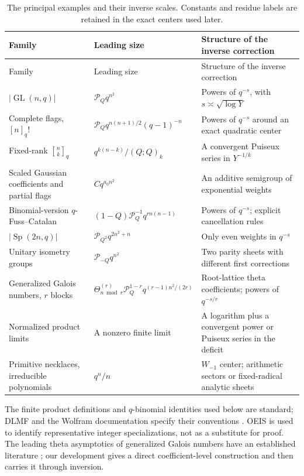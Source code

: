 \documentclass[11pt]{article}
\numberwithin{equation}{section}
\theoremstyle{definition}
\newcommand{\GL}{\operatorname{GL}}
\newcommand{\Sp}{\operatorname{Sp}}
\newcommand{\qbin}[2]{\genfrac{[}{]}{0pt}{}{#1}{#2}_{q}}
\newcommand{\pp}[1]{(Q;Q)_{#1}}
\newcommand{\Pinf}{\mathcal P_Q}
\newcommand{\T}{\Theta}
\begin{document}
\begin{longtable}{@{}>{\raggedright\arraybackslash}p{}>{\raggedright\arraybackslash}p{}>{\raggedright\arraybackslash}p{}@{}}
\caption{The principal examples and their inverse scales. Constants and residue labels are retained in the exact centers used later.}\label{tab:map}\\
\toprule
Family & Leading size & Structure of the inverse correction\\
\midrule\endfirsthead
\toprule Family & Leading size & Structure of the inverse correction\\\midrule\endhead
$\lvert\GL(n,q)\rvert$ & $\Pinf q^{n^2}$ & Powers of $q^{-s}$, with $s\asymp\sqrt{\log Y}$\\
Complete flags, $[n]_q!$ & $\Pinf q^{n(n+1)/2}(q-1)^{-n}$ & Powers of $q^{-s}$ around an exact quadratic center\\
Fixed-rank $\qbin{n}{k}$ & $q^{k(n-k)}/\pp{k}$ & A convergent Puiseux series in $Y^{-1/k}$\\
Scaled Gaussian coefficients and partial flags & $Cq^{a_0n^2}$ & An additive semigroup of exponential weights\\
Binomial-version $q$-Fuss--Catalan & $(1-Q)\Pinf^{-1}q^{r n(n-1)}$ & Powers of $q^{-s}$; explicit cancellation rules\\
$\lvert\Sp(2n,q)\rvert$ & $\mathcal P_{Q^2}q^{2n^2+n}$ & Only even weights in $q^{-s}$\\
Unitary isometry groups & $\mathcal P_{-Q}q^{n^2}$ & Two parity sheets with different first corrections\\
Generalized Galois numbers, $r$ blocks & $\T^{(r)}_{n\bmod r}\Pinf^{1-r}q^{(r-1)n^2/(2r)}$ & Root-lattice theta coefficients; powers of $q^{-s/r}$\\
Normalized product limits & A nonzero finite limit & A logarithm plus a convergent power or Puiseux series in the deficit\\
Primitive necklaces, irreducible polynomials & $q^n/n$ & $W_{-1}$ center; arithmetic sectors or fixed-radical analytic sheets\\
\bottomrule
\end{longtable}

The finite product definitions and $q$-binomial identities used below are standard; DLMF and the Wolfram documentation specify their conventions \cite{dlmfq,wolframqbin,wolframpoch}. OEIS is used to identify representative integer specializations, not as a substitute for proof. The leading theta asymptotics of generalized Galois numbers have an established literature \cite{kousidis,bliem}; our development gives a direct coefficient-level construction and then carries it through inversion.
\end{document}
